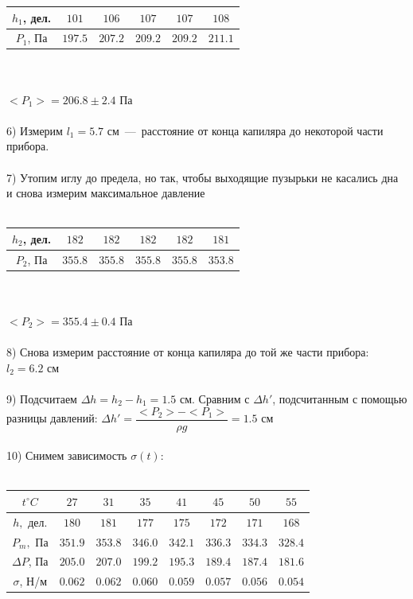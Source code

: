 \documentclass[12pt,a4paper]{article}
\begin{document}
    \begin{tabular}{c | c | c | c | c | c}
        $h_1$, дел. & $101$ & $106$ & $107$ & $107$ & $108$ \\ \hline
        $P_1$, Па & $197.5$ & $207.2$ & $209.2$ & $209.2$ & $211.1$ \\
    \end{tabular} \\\\
    $<P_1> = 206.8 \pm 2.4$ Па\\\\
    6) Измерим $l_1 = 5.7$ см~---~расстояние от конца капиляра до некоторой части прибора.\\\\
    7) Утопим иглу до предела, но так, чтобы выходящие пузырьки не касались дна и снова измерим максимальное давление \\\\
    \begin{tabular}{c | c | c | c | c | c}
        $h_2$, дел. & $182$ & $182$ & $182$ & $182$ & $181$ \\ \hline
        $P_2$, Па & $355.8$ & $355.8$ & $355.8$ & $355.8$ & $353.8$ \\
    \end{tabular} \\\\
    $<P_2> = 355.4 \pm 0.4$ Па \\\\
    8) Снова измерим расстояние от конца капиляра до той же части прибора: $l_2 = 6.2$ см\\\\
    9) Подсчитаем $\Delta h = h_2 - h_1 = 1.5$ см. Сравним с $\Delta h'$, подсчитанным с помощью разницы давлений: $\Delta h' = \dfrac{<P_2> - <P_1>}{\rho g} = 1.5$ см \\\\
    10) Снимем зависимость $\sigma (t)$:\\\\
    \begin{tabular}{c | c | c | c | c | c | c | c}
        $t^{\circ}C$ & $27$ & $31$ & $35$ & $41$ & $45$ & $50$ & $55$\\ \hline
        $h,$ дел. & $180$ & $181$ & $177$ & $175$ & $172$ & $171$ & $168$\\ \hline
        $P_m,$ Па & $351.9$ & $353.8$ & $346.0$ & $342.1$ & $336.3$ & $334.3$ & $328.4$\\ \hline
        $\Delta P$, Па & $205.0$ & $207.0$ & $199.2$ & $195.3$ & $189.4$ & $187.4$ & $181.6$\\ \hline
        $\sigma$, Н/м & $0.062$ & $0.062$ & $0.060$ & $0.059$ & $0.057$ & $0.056$ & $0.054$\\ 
    \end{tabular} \\\\
\end{document}

